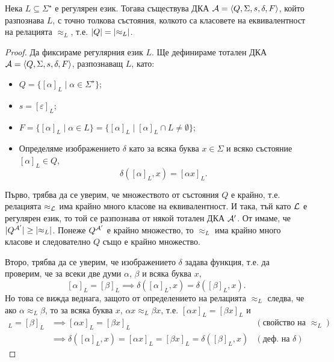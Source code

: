 \begin{thm}
  \label{th:myhill-nerode}
  Нека $L\subseteq \Sigma^\star$ е регулярен език.
  Тогава съществува ДКА $\mathcal{A} = \langle{Q,\Sigma,s,\delta,F}\rangle$, който разпознава $L$,
  с точно толкова състояния, колкото са класовете на еквивалентност на релацията $\approx_L$,
  т.е. $\lvert{Q}\rvert = \lvert{\approx_L}\rvert$.
\end{thm}
\begin{proof}
  Да фиксираме регулярния език $L$.
  Ще дефинираме тотален ДКА $\mathcal{A} = \langle{Q,\Sigma,s,\delta,F}\rangle$, разпознаващ $L$, като:
  \begin{itemize}
  \item
    $Q = \{[\alpha]_L\mid \alpha\in \Sigma^\star\}$;
  \item
    $s = [\varepsilon]_L$;
  \item
    $F = \{[\alpha]_L\mid \alpha\in L\} = \{[\alpha]_L \mid [\alpha]_L \cap L \neq \emptyset\}$;
  \item
    Определяме изображението $\delta$ като 
    за всяка буква $x \in \Sigma$ и всяко състояние $[\alpha]_L\in Q$, 
    \[\delta([\alpha]_L,x) = [\alpha x]_L.\]
  \end{itemize}
  
  Първо, трябва да се уверим, че множеството от състояния $Q$ е крайно, т.е.
  релацията $\approx_{\mathcal{L}}$ има крайно много класове на еквивалентност.
  И така, тъй като $\mathcal{L}$ е регулярен език, то той се разпознава от някой тотален ДКА $\mathcal{A}'$.
  От  имаме, че $\lvert{Q^{\mathcal{A}'}}\rvert \geq \lvert{\approx_L}\rvert$.
  Понеже $Q^{\mathcal{A}'}$ е крайно множество, то $\approx_L$ има крайно много класове и 
  следователно $Q$ също е крайно множество.

  Второ, трябва да се уверим, че изображението $\delta$ задава функция, т.е. 
  да проверим, че за всеки две думи $\alpha$, $\beta$ и всяка буква $x$,
  \[[\alpha]_L = [\beta]_L \implies \delta([\alpha]_L,x) = \delta([\beta]_L,x).\]
  Но това се вижда веднага, защото от определението на релацията $\approx_L$ следва, че
  ако $\alpha \approx_L \beta$, то за всяка буква $x$, $\alpha x \approx_L \beta x$,
  т.е. $[\alpha x]_L = [\beta x]_L$ и 
  \begin{align*}
    [\alpha]_L = [\beta]_L & \implies [\alpha x]_L = [\beta x]_L & (\text{свойство на }\approx_L)\\
    & \implies \delta([\alpha]_L,x) = [\alpha x]_L = [\beta x]_L = \delta([\beta]_L,x) & (\text{деф. на }\delta)
  \end{align*}
  

\end{proof}
